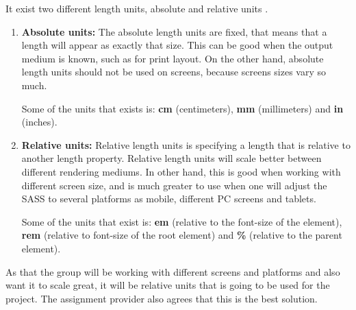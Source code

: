 It exist two different length units, absolute and relative units \cite{Units_1}.
\begin{enumerate}
  \item \textbf{Absolute units:} The absolute length units are fixed, that means that a length will appear as exactly that size. This can be good when the output medium is known, such as for print layout. On the other hand, absolute length units should not be used on screens, because screens sizes vary so much. 
  
  Some of the units that exists is: \textbf{cm} (centimeters), \textbf{mm} (millimeters) and \textbf{in} (inches).
  \item \textbf{Relative units:} Relative length units is specifying a length that is relative to another length property. Relative length units will scale better between different rendering mediums. In other hand, this is good when working with different screen size, and is much greater to use when one will adjust the SASS to several platforms as mobile, different PC screens and tablets. 
  
  Some of the units that exist is: \textbf{em} (relative to the font-size of the element), \textbf{rem} (relative to font-size of the root element) and \textbf{\%} (relative to the parent element).
\end{enumerate}

As that the group will be working with different screens and platforms and also want it to scale great, it will be relative units that is going to be used for the project. The assignment provider also agrees that this is the best solution.


